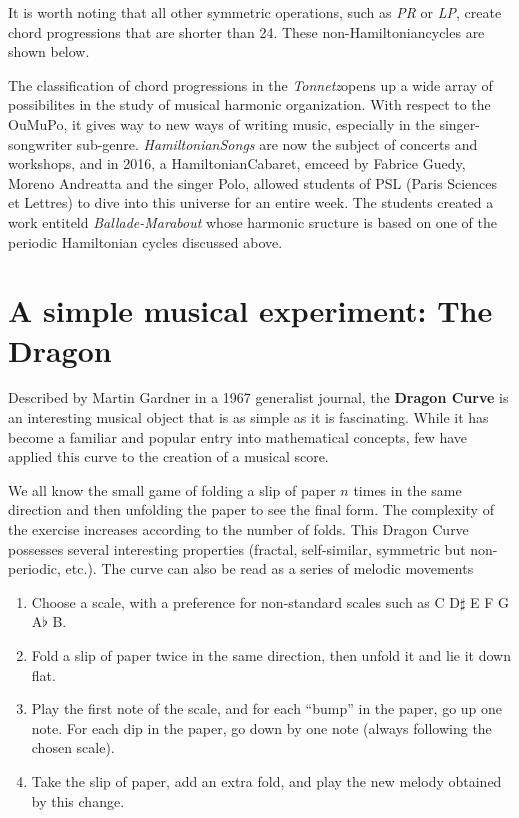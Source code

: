 \documentclass{article}
\newcommand{\Tonnetz}{\emph{Tonnetz}}
\newcommand{\Hamiltonian}{Hamiltonian}
\begin{document}
It is worth noting that all other symmetric operations, such as \emph{PR} or
\emph{LP}, create chord progressions that are shorter than 24.  These
non-\Hamiltonian cycles are shown below.

The classification of chord progressions in the \Tonnetz opens up a wide
array of possibilites in the study of musical harmonic organization.  With
respect to the OuMuPo, it gives way to new ways of writing music, especially
in the singer-songwriter sub-genre.  \emph{\Hamiltonian Songs} are now the
subject of concerts and workshops, and in 2016, a \Hamiltonian Cabaret,
emceed by Fabrice Guedy, Moreno Andreatta and the singer Polo, allowed
students of PSL (Paris Sciences et Lettres) to dive into this universe for
an entire week.  The students created a work entiteld \emph{Ballade-Marabout}
whose harmonic sructure is based on one of the periodic Hamiltonian cycles
discussed above.

\section*{A simple musical experiment: The Dragon}
Described by Martin Gardner in a 1967 generalist journal, the \textbf{Dragon
Curve} is an interesting musical object that is as simple as it is
fascinating.  While it has become a familiar and popular entry into
mathematical concepts, few have applied this curve to the creation of a
musical score.

We all know the small game of folding a slip of paper $n$ times in the same
direction and then unfolding the paper to see the final form.  The
complexity of the exercise increases according to the number of folds.  This
Dragon Curve possesses several interesting properties (fractal,
self-similar, symmetric but non-periodic, etc.).  The curve can also be read
as a series of melodic movements
\begin{enumerate}
\item Choose a scale, with a preference for non-standard scales such as C
D$\sharp$ E F G A$\flat$ B.
\item Fold a slip of paper twice in the same direction, then unfold it and
lie it down flat.
\item Play the first note of the scale, and for each ``bump'' in the paper,
go up one note.  For each dip in the paper, go down by one note (always
following the chosen scale).
\item Take the slip of paper, add an extra fold, and play the new melody
obtained by this change.
\end{enumerate}
\end{document}
